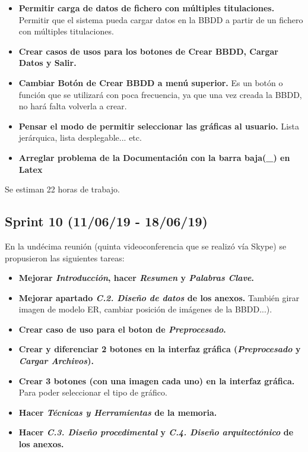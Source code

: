 \begin{itemize}
\item
\textbf{Permitir carga de datos de fichero con múltiples titulaciones.} Permitir que el sistema pueda cargar datos en la BBDD a partir de un fichero con múltiples titulaciones.
\item
\textbf{Crear casos de usos para los botones de Crear BBDD, Cargar Datos y Salir.}
\item
\textbf{Cambiar Botón de Crear BBDD a menú superior.} Es un botón o función que se utilizará con poca frecuencia, ya que una vez creada la BBDD, no hará falta volverla a crear.
\item
\textbf{Pensar el modo de permitir seleccionar las gráficas al usuario.} Lista jerárquica, lista desplegable... etc.
\item
\textbf{Arreglar problema de la Documentación con la barra baja(\_) en Latex}
\end{itemize}

Se estiman 22 horas de trabajo.

\subsection{Sprint 10 (11/06/19 - 18/06/19)}
En la undécima reunión (quinta videoconferencia que se realizó vía Skype) se propusieron las siguientes tareas:

\begin{itemize}
\item
\textbf{Mejorar \emph{Introducción}, hacer \emph{Resumen} y \emph{Palabras Clave}.}
\item
\textbf{Mejorar apartado \emph{C.2. Diseño de datos} de los anexos.} También girar imagen de modelo ER, cambiar posición de imágenes de la BBDD...).
\item
\textbf{Crear caso de uso para el boton de \emph{Preprocesado}.}
\item
\textbf{Crear y diferenciar 2 botones en la interfaz gráfica (\emph{Preprocesado} y \emph{Cargar Archivos}).} 
\item
\textbf{Crear 3 botones (con una imagen cada uno) en la interfaz gráfica.} Para poder seleccionar el tipo de gráfico.
\item
\textbf{Hacer \emph{Técnicas y Herramientas} de la memoria.}
\item
\textbf{Hacer \emph{C.3. Diseño procedimental} y \emph{C.4. Diseño arquitectónico} de los anexos.}
\end{itemize}

